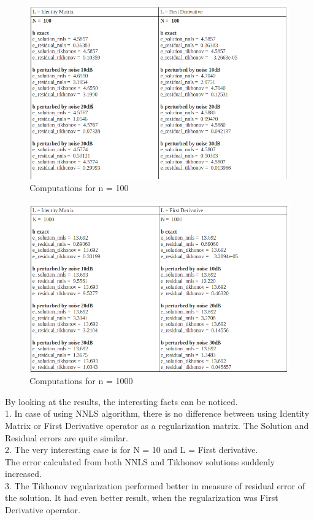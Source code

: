 \documentclass[eng,openany]{mgr}
\begin{document}
\begin{figure}[h]
\centering
\includegraphics[width=0.7\linewidth]{screenshot010}
\caption{Computations for n = 100}
\label{fig:screenshot010}
\end{figure}

\begin{figure}[h]
\centering
\includegraphics[width=0.7\linewidth]{screenshot011}
\caption{Computations for n = 1000}
\label{fig:screenshot011}
\end{figure}
By looking at the results, the interesting facts can be noticed.\\
1. In case of using NNLS algorithm, there is no difference between using Identity Matrix or First Derivative operator as a regularization matrix. The Solution and Residual errors are quite similar.\\
2. The very interesting case is for N = 10 and L = First derivative.\\The error calculated from both NNLS and Tikhonov solutions suddenly increased.\\
3. The Tikhonov regularization performed better in measure of residual error of the solution. It had even better result, when the regularization was First Derivative operator.
\end{document}

